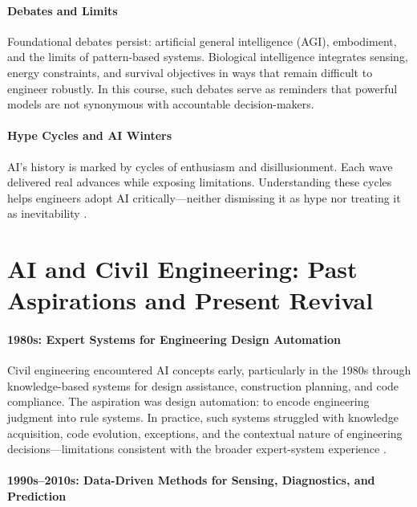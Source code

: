 \documentclass[12pt]{article}
\begin{document}
\paragraph{Debates and Limits}
Foundational debates persist: artificial general intelligence (AGI), embodiment, and the limits of pattern-based systems. Biological intelligence integrates sensing, energy constraints, and survival objectives in ways that remain difficult to engineer robustly. In this course, such debates serve as reminders that powerful models are not synonymous with accountable decision-makers.

\paragraph{Hype Cycles and AI Winters}
AI’s history is marked by cycles of enthusiasm and disillusionment. Each wave delivered real advances while exposing limitations. Understanding these cycles helps engineers adopt AI critically—neither dismissing it as hype nor treating it as inevitability \cite{russell_norvig_2021}.

\section*{AI and Civil Engineering: Past Aspirations and Present Revival}
\paragraph{1980s: Expert Systems for Engineering Design Automation}
Civil engineering encountered AI concepts early, particularly in the 1980s through knowledge-based systems for design assistance, construction planning, and code compliance. The aspiration was design automation: to encode engineering judgment into rule systems. In practice, such systems struggled with knowledge acquisition, code evolution, exceptions, and the contextual nature of engineering decisions—limitations consistent with the broader expert-system experience \cite{feigenbaum_1982,russell_norvig_2021}.

\paragraph{1990s--2010s: Data-Driven Methods for Sensing, Diagnostics, and Prediction}
\end{document}
